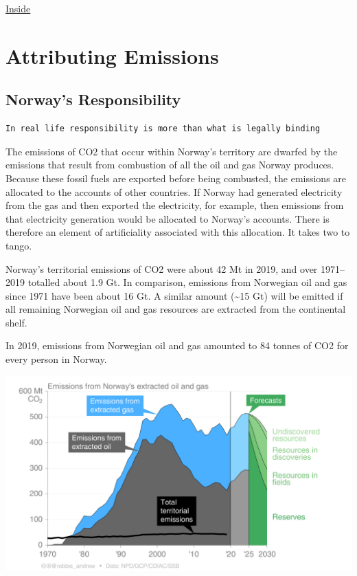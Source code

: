 \documentclass[
]{book}
\begin{document}
\href{https://insideclimatenews.org/news/20042021/methane-biden-climate-summit/}{Inside}

\hypertarget{attributing-emissions}{%
\section{Attributing Emissions}\label{attributing-emissions}}

\hypertarget{norways-responsibility}{%
\subsection{Norway's Responsibility}\label{norways-responsibility}}

\begin{verbatim}
In real life responsibility is more than what is legally binding
\end{verbatim}

The emissions of CO2 that occur within Norway's territory are dwarfed by the emissions that result from combustion of all the oil and gas Norway produces. Because these fossil fuels are exported before being combusted, the emissions are allocated to the accounts of other countries. If Norway had generated electricity from the gas and then exported the electricity, for example, then emissions from that electricity generation would be allocated to Norway's accounts. There is therefore an element of artificiality associated with this allocation. It takes two to tango.

Norway's territorial emissions of CO2 were about 42 Mt in 2019, and over 1971--2019 totalled about 1.9 Gt. In comparison, emissions from Norwegian oil and gas since 1971 have been about 16 Gt. A similar amount (\textasciitilde15 Gt) will be emitted if all remaining Norwegian oil and gas resources are extracted from the continental shelf.

In 2019, emissions from Norwegian oil and gas amounted to 84 tonnes of CO2 for every person in Norway.

\includegraphics{fig/Emissions_extracted_Oil_Gas_Norway.png}
\end{document}
